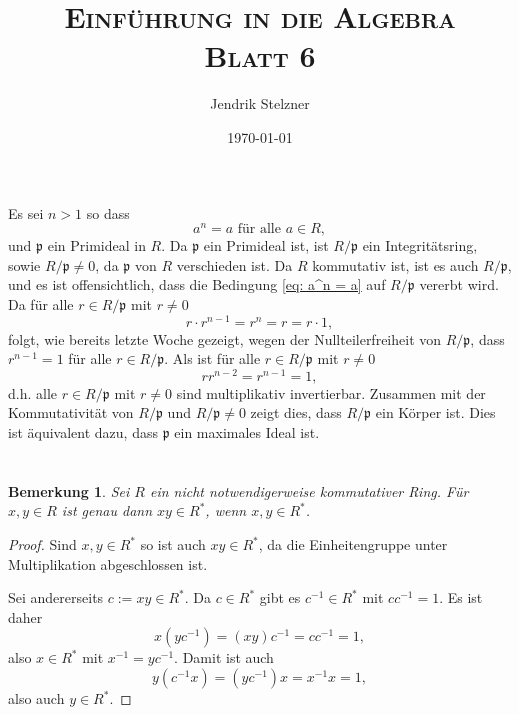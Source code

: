 \documentclass[a4paper,10pt]{article}
\title{\textsc{Einführung in die Algebra \\ \Large Blatt 6}}
\author{Jendrik Stelzner}
\date{\today}
\newcounter{satze}
\newtheorem{bem}[satze]{Bemerkung}
\newcommand{\mf}[1]{\mathfrak{#1}}
\begin{document}
\maketitle





\section{}
Es sei $n > 1$ so dass
\begin{equation}\label{eq: a^n = a}
 a^n = a \text{ für alle } a \in R,
\end{equation}
und $\mf{p}$ ein Primideal in $R$. Da $\mf{p}$ ein Primideal ist, ist $R/\mf{p}$ ein Integritätsring, sowie $R/\mf{p} \neq 0$, da $\mf{p}$ von $R$ verschieden ist. Da $R$ kommutativ ist, ist es auch $R/\mf{p}$, und es ist offensichtlich, dass die Bedingung \eqref{eq: a^n = a} auf $R/\mf{p}$ vererbt wird. Da für alle $r \in R/\mf{p}$ mit $r \neq 0$
\[
 r \cdot r^{n-1} = r^n = r = r \cdot 1,
\]
folgt, wie bereits letzte Woche gezeigt, wegen der Nullteilerfreiheit von $R/\mf{p}$, dass $r^{n-1} = 1$ für alle $r \in R/\mf{p}$. Als ist für alle $r \in R/\mf{p}$ mit $r \neq 0$
\[
 r r^{n-2} = r^{n-1} = 1,
\]
d.h. alle $r \in R/\mf{p}$ mit $r \neq 0$ sind multiplikativ invertierbar. Zusammen mit der Kommutativität von $R/\mf{p}$ und $R/\mf{p} \neq 0$ zeigt dies, dass $R/\mf{p}$ ein Körper ist. Dies ist äquivalent dazu, dass $\mf{p}$ ein maximales Ideal ist.





\section{}

\begin{bem}\label{bem: produkt in Einheitengruppe}
 Sei $R$ ein nicht notwendigerweise kommutativer Ring. Für $x,y \in R$ ist genau dann $xy \in R^*$, wenn $x,y \in R^*$.
\end{bem}
\begin{proof}
 Sind $x,y \in R^*$ so ist auch $xy \in R^*$, da die Einheitengruppe unter Multiplikation abgeschlossen ist.
 
 Sei andererseits $c := xy \in R^*$. Da $c \in R^*$ gibt es $c^{-1} \in R^*$ mit $c c^{-1} = 1$. Es ist daher
 \[
  x (yc^{-1}) = (xy) c^{-1} = c c^{-1} = 1,
 \]
 also $x \in R^*$ mit $x^{-1} = yc^{-1}$. Damit ist auch
 \[
  y(c^{-1} x) = (y c^{-1}) x =  x^{-1} x = 1,
 \]
 also auch $y \in R^*$.
\end{proof}
\end{document}
